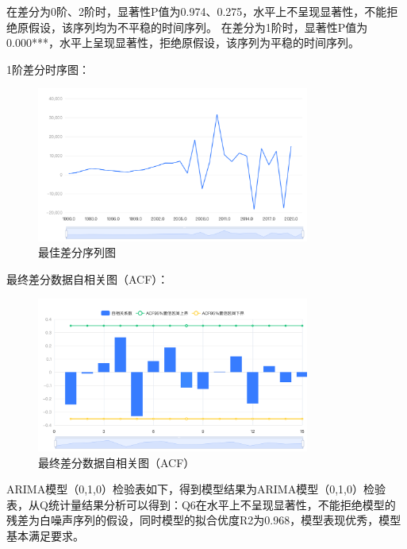 \documentclass[12pt, a4paper, oneside]{ctexart}
\begin{document}
在差分为0阶、2阶时，显著性P值为0.974、0.275，水平上不呈现显著性，不能拒绝原假设，该序列均为不平稳的时间序列。
在差分为1阶时，显著性P值为0.000***，水平上呈现显著性，拒绝原假设，该序列为平稳的时间序列。

1阶差分时序图：

\begin{figure}[H]
  \centering
  \includegraphics[width=0.8\textwidth]{pic/最佳差分序列图.png}
  \caption{最佳差分序列图}
  \label{fig:最佳差分序列图}
\end{figure}



最终差分数据自相关图（ACF）：

\begin{figure}[H]
  \centering
  \includegraphics[width=0.8\textwidth]{pic/最终差分数据自相关图（ACF） (1).png}
  \caption{最终差分数据自相关图（ACF）}
  \label{fig:ACF}
\end{figure}


ARIMA模型（0,1,0）检验表如下，得到模型结果为ARIMA模型（0,1,0）检验表，从Q统计量结果分析可以得到：Q6在水平上不呈现显著性，不能拒绝模型的残差为白噪声序列的假设，同时模型的拟合优度R2为0.968，模型表现优秀，模型基本满足要求。
\end{document}
